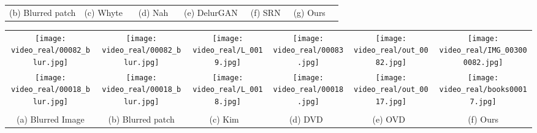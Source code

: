 \documentclass[10pt,twocolumn,letterpaper]{article}
\newcommand{\widthscalesix}{0.15}
\begin{document}
\begin{figure*}[htb]
\begin{tabular}{ccccccc}
				(b) Blurred patch& (c) Whyte \etal~\cite{whyte2012non} & (d) Nah \etal~\cite{nah2017deep} & (e) DelurGAN~\cite{kupyn2017deblurgan}& (f) SRN~\cite{tao2018scale}& (g) Ours\\
	\end{tabular}
	\vspace{-0em}
	\caption{Visual comparisons of deblurring results on test images from the GoPro dataset~\cite{nah2017deep}. Key blurred patches are shown in (b), while zoomed-in patches from the deblurred results are shown in (c)-(g). (best viewed in high resolution).}
\label{fig:dynamic}
	\vspace{-0em}
\end{figure*} 


\begin{figure*}[!htb]\scriptsize
	\centering
\begin{tabular}{cccccc}
				\texttt{[image: video\_real/00082\_blur.jpg]}
				&
				\texttt{[image: video\_real/00082\_blur.jpg]} & \texttt{[image: video\_real/L\_0019.jpg]} & \texttt{[image: video\_real/00083.jpg]} & \texttt{[image: video\_real/out\_0082.jpg]} & \texttt{[image: video\_real/IMG\_003000082.jpg]}	
				\\
\texttt{[image: video\_real/00018\_blur.jpg]}
				&
				\texttt{[image: video\_real/00018\_blur.jpg]} & \texttt{[image: video\_real/L\_0018.jpg]} & \texttt{[image: video\_real/00018.jpg]} & \texttt{[image: video\_real/out\_0017.jpg]} & \texttt{[image: video\_real/books00017.jpg]}				\vspace{-3mm}

				\\ 
				\\ 
								(a) Blurred Image&

				(b) Blurred patch& (c) Kim \etal~\cite{hyun2015generalized} & (d) DVD~\cite{su2017deep} & (e) OVD~\cite{hyun2017online}& (f) Ours\\
	\end{tabular}
	\vspace{-0em}
	\caption{Visual comparisons of video deblurring results on two test frames from the DVD dataset~\cite{su2017deep}. Key blurred patches are shown in (b), while zoomed-in patches from the deblurred results are shown in (c)-(f). (best viewed in high resolution).}
\label{fig:video}
	\vspace{-0.0em}
\end{figure*} 
\end{document}
